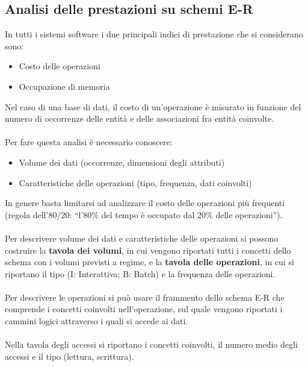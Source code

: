 \documentclass[../main.tex]{subfiles}
\begin{document}
	\subsection{Analisi delle prestazioni su schemi E-R}
	In tutti i sistemi software i due principali indici di prestazione che si considerano sono:
	\begin{itemize}
		\item Costo delle operazioni
		\item Occupazione di memoria
	\end{itemize}
	Nel caso di una base di dati, il costo di un’operazione è misurato in funzione del numero di occorrenze delle entità e delle associazioni fra entità coinvolte.\\\\
	Per fare questa analisi è necessario conoscere:
	\begin{itemize}
		\item Volume dei dati (occorrenze, dimensioni degli attributi)
		\item Caratteristiche delle operazioni (tipo, frequenza, dati coinvolti)
	\end{itemize}
	In genere basta limitarsi ad analizzare il costo delle operazioni più frequenti (regola dell’80/20: “l’80\% del tempo è occupato dal 20\% delle operazioni”).\\\\
	Per descrivere volume dei dati e caratteristiche delle operazioni si possono costruire la \textbf{tavola dei volumi}, in cui vengono riportati tutti i concetti dello schema con i volumi previsti a regime, e la \textbf{tavola delle operazioni}, in cui si riportano il tipo (I: Interattiva; B: Batch) e la frequenza delle operazioni.\\\\
	Per descrivere le operazioni si può usare il frammento dello schema E-R che comprende i concetti coinvolti nell’operazione, sul quale vengono riportati i cammini logici attraverso i quali si accede ai dati.\\\\
	Nella tavola degli accessi si riportano i concetti coinvolti, il numero medio degli accessi e il tipo (lettura, scrittura).
\end{document}
